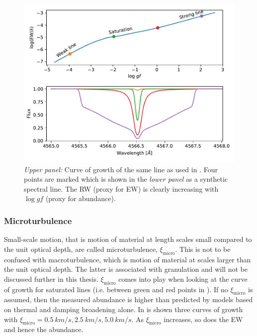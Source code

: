 \begin{figure}[htpb!]
    \centering
    \includegraphics[width=1.0\linewidth]{figures/cog.pdf}
    \caption{\emph{Upper panel:} Curve of growth of the same  line as
             used in . Four points are marked which is shown in
             the \emph{lower panel} as a synthetic spectral line. The RW (proxy
             for EW) is clearly increasing with $\log \mathit{gf}$ (proxy for
             abundance).}
    \label{fig:cog}
\end{figure}


\subsubsection{Microturbulence}

Small-scale motion, that is motion of material at length scales small compared
to the unit optical depth, are called microturbulence, $\xi_\mathrm{micro}$.
This is not to be confused with macroturbulence, which is motion of material at
scales larger than the unit optical depth. The latter is associated with
granulation and will not be discussed further in this thesis.
$\xi_\mathrm{micro}$ comes into play when looking at the curve of growth for
saturated lines (i.e. between green and red points in ). If no
$\xi_\mathrm{micro}$ is assumed, then the measured abundance is higher than
predicted by models based on thermal and damping broadening alone. In
 is shown three curves of growth with
$\xi_\mathrm{micro}={\SI{0.5}{km/s}, \SI{2.5}{km/s}, \SI{5.0}{km/s}}$. As
$\xi_\mathrm{micro}$ increases, so does the EW and hence the abundance.

